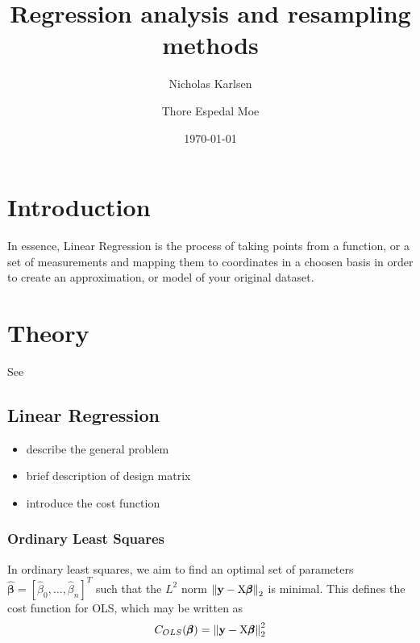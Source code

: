 \documentclass[reprint, english, nofootinbib]{revtex4-2}
\begin{document}
\title{Regression analysis and resampling methods}
\author{Nicholas Karlsen}
\author{Thore Espedal Moe}
\date{\today}

\begin{abstract}
    \blindtext %
\end{abstract}

\maketitle

\section{Introduction}
    \noindent
    In essence, Linear Regression is the process of taking points from a function, or a set of measurements and mapping them to coordinates in a choosen basis in order to create an approximation, or model of your original dataset.
\section{Theory}
    See \textcite{hastie}
    \subsection{Linear Regression}
        \begin{itemize}
            \item describe the general problem
            \item brief description of design matrix
            \item introduce the cost function
        \end{itemize}

        \subsubsection{Ordinary Least Squares}
            \noindent
            In ordinary least squares, we aim to find an optimal set of parameters $\pmb{\hat\beta} = [\hat\beta_0, \dots, \hat\beta_n]^T$ such that the $L^2$ norm $\norm{\mathbf y - \textup{X}\pmb{\beta}}_2$ is minimal. This defines the cost function for OLS, which may be written as
            \begin{equation}
                C_{OLS}(\pmb \beta)
                = \norm{{\mathbf y}
                - \textup{X}\pmb{\beta}}^2_2
            \end{equation}
\end{document}
